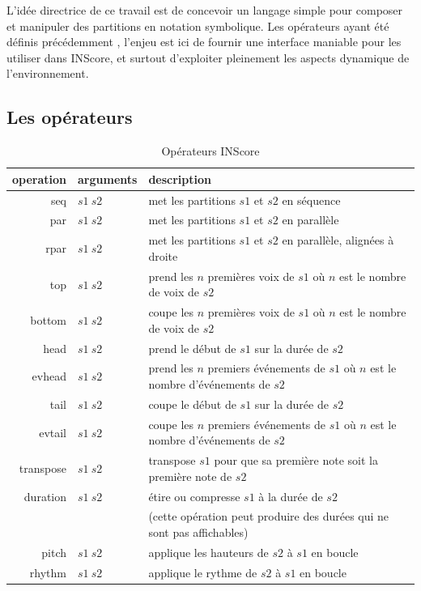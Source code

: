 \documentclass{article}
\begin{document}
L'idée directrice de ce travail est de concevoir un langage simple pour composer et manipuler des partitions en notation symbolique. Les opérateurs ayant été définis précédemment \cite{fober12b}, l'enjeu est ici de fournir une interface maniable pour les utiliser dans INScore, et surtout d'exploiter pleinement les aspects dynamique de l'environnement.

\subsection{Les opérateurs}

\begin{table}[htdp]
\begin{center}
\begin{tabular}{rll}
\hline
operation & arguments		&	description \\
\hline
seq 	&	$s1\ s2$		& met les partitions $s1$ et $s2$ en séquence \\
par 	&	$s1\ s2$		& met les partitions $s1$ et $s2$ en parallèle \\ 
rpar	&	$s1\ s2$		& met les partitions $s1$ et $s2$ en parallèle, alignées à droite \\
top 	&	$s1\ s2$ 	& prend les $n$ premières voix de $s1$ où $n$ est le nombre de voix de $s2$ \\
bottom 	&	$s1\ s2$ 	& coupe les $n$ premières voix de $s1$ où $n$ est le nombre de voix de $s2$ \\
head	& 	$s1\ s2$	& prend le début de $s1$ sur la durée de $s2$ \\
evhead 	&	$s1\ s2$	& prend les $n$ premiers événements de $s1$ où $n$ est le nombre d'événements de $s2$ \\
tail	&	$s1\ s2$ 	& coupe le début de $s1$ sur la durée de $s2$ \\
evtail 	&	$s1\ s2$ 	& coupe les $n$ premiers événements de $s1$ où $n$ est le nombre d'événements de $s2$ \\
transpose 	&	$s1\ s2$	& transpose $s1$ pour que sa première note soit la première note de $s2$ \\
duration 	&	$s1\ s2$	& étire ou compresse $s1$ à la durée de $s2$  \\
			& 	& 	(cette opération peut produire des durées qui ne sont pas affichables) \\
pitch 	&	$s1\ s2$	& applique les hauteurs de $s2$ à $s1$ en boucle \\
rhythm 	&	$s1\ s2$	& applique le rythme de $s2$ à $s1$ en boucle \\
\hline
\end{tabular}
\end{center}

\caption{Opérateurs INScore}
\label{operations}
\end{table}
\end{document}
